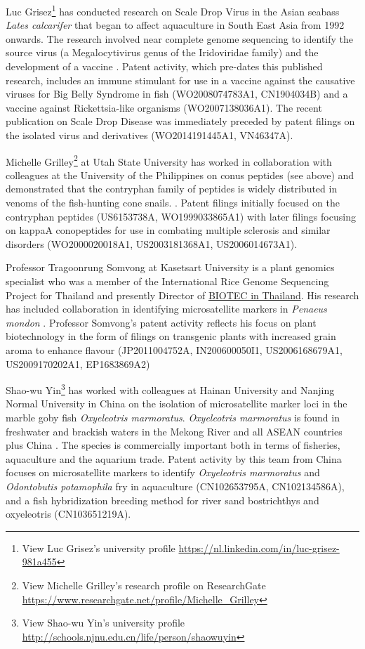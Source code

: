 \documentclass[]{book}
\let\rmarkdownfootnote\footnote%
\def\footnote{\protect\rmarkdownfootnote}
\theoremstyle{definition}
\theoremstyle{definition}
\theoremstyle{definition}
\theoremstyle{remark}
\begin{document}
Luc Grisez\footnote{View Luc Grisez's university profile
  \url{https://nl.linkedin.com/in/luc-grisez-981a455}} has conducted
research on Scale Drop Virus in the Asian seabass \emph{Lates
calcarifer} that began to affect aquaculture in South East Asia from
1992 onwards. The research involved near complete genome sequencing to
identify the source virus (a Megalocytivirus genus of the Iridoviridae
family) and the development of a vaccine \citep{de_Groof_2015}. Patent
activity, which pre-dates this published research, includes an immune
stimulant for use in a vaccine against the causative viruses for Big
Belly Syndrome in fish (WO2008074783A1, CN1904034B) and a vaccine
against Rickettsia-like organisms (WO2007138036A1). The recent
publication on Scale Drop Disease was immediately preceded by patent
filings on the isolated virus and derivatives (WO2014191445A1,
VN46347A).

Michelle Grilley\footnote{View Michelle Grilley's research profile on
  ResearchGate
  \url{https://www.researchgate.net/profile/Michelle_Grilley}} at Utah
State University has worked in collaboration with colleagues at the
University of the Philippines on conus peptides (see above) and
demonstrated that the contryphan family of peptides is widely
distributed in venoms of the fish-hunting cone snails. \citep[originally
published 1998]{Jacobsen_2009}. Patent filings initially focused on the
contryphan peptides (US6153738A, WO1999033865A1) with later filings
focusing on kappaA conopeptides for use in combating multiple sclerosis
and similar disorders (WO2000020018A1, US2003181368A1, US2006014673A1).

Professor Tragoonrung Somvong at Kasetsart University is a plant
genomics specialist who was a member of the International Rice Genome
Sequencing Project for Thailand and presently Director of
\href{http://www.biotec.or.th/en/index.php/about-us/management-team}{BIOTEC
in Thailand}. His research has included collaboration in identifying
microsatellite markers in \emph{Penaeus mondon}
\citep{Wuthisuthimethavee_2003}. Professor Somvong's patent activity
reflects his focus on plant biotechnology in the form of filings on
transgenic plants with increased grain aroma to enhance flavour
(JP2011004752A, IN200600050I1, US2006168679A1, US2009170202A1,
EP1683869A2)

Shao-wu Yin\footnote{View Shao-wu Yin's university profile
  \url{http://schools.njnu.edu.cn/life/person/shaowuyin}} has worked
with colleagues at Hainan University and Nanjing Normal University in
China on the isolation of microsatellite marker loci in the marble goby
fish \emph{Oxyeleotris marmoratus}. \emph{Oxyeleotris marmoratus} is
found in freshwater and brackish waters in the Mekong River and all
ASEAN countries plus China \citep{Oxyeleotris_2011}. The species is
commercially important both in terms of fisheries, aquaculture and the
aquarium trade. Patent activity by this team from China focuses on
microsatellite markers to identify \emph{Oxyeleotris marmoratus} and
\emph{Odontobutis potamophila} fry in aquaculture (CN102653795A,
CN102134586A), and a fish hybridization breeding method for river sand
bostrichthys and oxyeleotris (CN103651219A).
\end{document}
